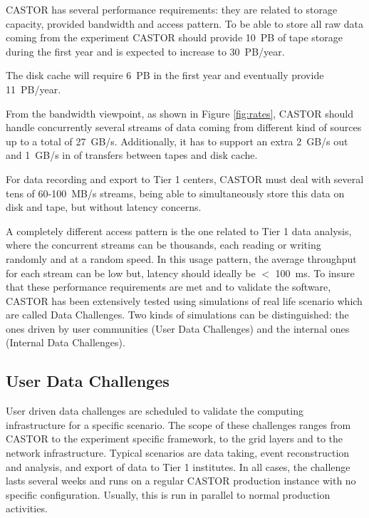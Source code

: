 CASTOR has several performance requirements: they are related to storage capacity,
provided bandwidth and access pattern.
To be able to store all raw data coming from the experiment CASTOR should provide 10~PB
of tape storage during the first year and is expected to increase to 30~PB/year.

The disk cache will require 6~PB in the first year and eventually provide 11~PB/year.

From the bandwidth viewpoint, as shown in Figure \ref{fig:rates}, CASTOR should handle concurrently
several streams of data coming from different kind of sources up to a total of  27~GB/s.
Additionally, it has to support an extra 2~GB/s out and 1~GB/s in of transfers between tapes and disk cache.

For data recording and export to Tier 1 centers, CASTOR must deal with several tens
of 60-100~MB/s streams, being able to simultaneously store this data on disk and tape,
but without latency concerns.

A completely different access pattern is the one related to Tier 1 data analysis,
where the concurrent streams can be thousands, each reading or writing randomly
and at a random speed. In this usage pattern, the average throughput for each stream
can be low but, latency should ideally be $<$ 100~ms.
To insure that these performance requirements are met and to validate the software,
CASTOR has been extensively tested using simulations of real life scenario which are called Data Challenges.
Two kinds of simulations can be distinguished: the ones driven by user
communities (User Data Challenges) and the internal ones (Internal Data Challenges).


\subsection{User Data Challenges}

User driven data challenges are scheduled to validate the computing
infrastructure for a specific scenario.
The scope of these challenges ranges from CASTOR to the experiment specific framework, to the grid layers
and to the network infrastructure.
Typical scenarios are data taking, event reconstruction
and analysis, and export of data to Tier 1 institutes.
In all cases, the challenge lasts several weeks and
runs on a regular CASTOR production instance with no specific configuration.
Usually, this is run in parallel to normal production activities.

